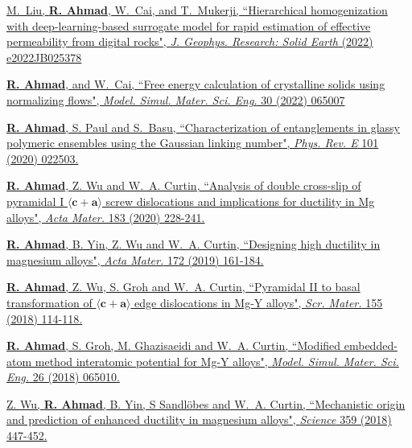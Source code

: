\documentclass[margin,line]{resume}
\begin{document}
\begin{resume}
    \href{https://agupubs.onlinelibrary.wiley.com/doi/abs/10.1029/2022JB025378} {M.~Liu, \textbf{R. Ahmad}, W.~Cai, and T.~Mukerji, ``Hierarchical homogenization with deep-learning-based surrogate model for rapid estimation of effective permeability from digital rocks", \textit{J. Geophys. Research: Solid Earth} (2022) e2022JB025378}

    \href{https://iopscience.iop.org/article/10.1088/1361-651X/ac7f4b} {\textbf{R. Ahmad}, and W.~Cai, ``Free energy calculation of crystalline solids using normalizing flows", \textit{Model. Simul. Mater. Sci. Eng.} 30 (2022) 065007}

    \href{https://journals.aps.org/pre/abstract/10.1103/PhysRevE.101.022503} {\textbf{R. Ahmad}, S. Paul and S.~Basu, ``Characterization of entanglements in glassy polymeric ensembles using the Gaussian linking number", \textit{Phys. Rev. E} 101 (2020) 022503.}

    \href{https://www.sciencedirect.com/science/article/pii/S1359645419307256} {\textbf{R. Ahmad}, Z. Wu and W.~A.
        Curtin, ``Analysis of double cross-slip of pyramidal I $\langle \boldsymbol{c} + \boldsymbol{a} \rangle$ screw dislocations and implications for ductility in Mg alloys", \textit{Acta Mater.} 183 (2020) 228-241.}

    \href{https://www.sciencedirect.com/science/article/pii/S1359645419302198} {\textbf{R. Ahmad}, B. Yin, Z. Wu and W.~A. Curtin, ``Designing high ductility in magnesium alloys", \textit{Acta Mater.} 172 (2019) 161-184.}

    \href{https://www.sciencedirect.com/science/article/pii/S1359646218303804}{\textbf{R. Ahmad}, Z. Wu, S. Groh and W.~A. Curtin, ``Pyramidal II to basal transformation of $\langle \boldsymbol{c} + \boldsymbol{a} \rangle$ edge dislocations in Mg-Y alloys", \textit{Scr. Mater.} 155 (2018) 114-118.}

    \href{https://iopscience.iop.org/article/10.1088/1361-651X/aacfd2}{\textbf{R. Ahmad}, S. Groh, M. Ghazisaeidi and W.~A. Curtin, ``Modified embedded-atom method interatomic potential for Mg-Y alloys", \textit{Model. Simul. Mater. Sci. Eng.} 26 (2018) 065010.}

    \href{https://science.sciencemag.org/content/359/6374/447.full} {Z. Wu, \textbf{R. Ahmad}, B. Yin, S Sandlöbes and W.~A. Curtin, ``Mechanistic origin and prediction of enhanced ductility in magnesium alloys", \textit{Science} 359 (2018) 447-452.}

    \clearpage


\end{resume}
\end{document}
